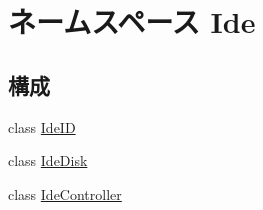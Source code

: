 \hypertarget{namespaceIde}{
\section{ネームスペース Ide}
\label{namespaceIde}
}
\subsection*{構成}
\begin{DoxyCompactItemize}
\item 
class \hyperlink{classIde_1_1IdeID}{IdeID}
\item 
class \hyperlink{classIde_1_1IdeDisk}{IdeDisk}
\item 
class \hyperlink{classIde_1_1IdeController}{IdeController}
\end{DoxyCompactItemize}
